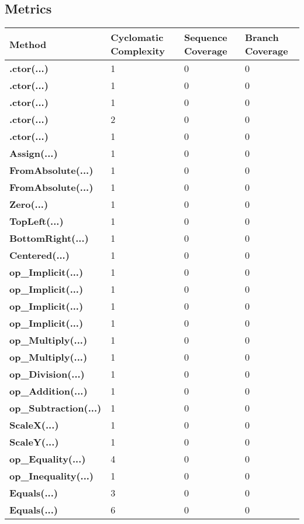 \documentclass[a4paper,10pt]{article}
\begin{document}
\subsection{Metrics}
\begin{longtable}[l]{|l|l|l|l|}
\hline
\textbf{Method} & \textbf{Cyclomatic Complexity} & \textbf{Sequence Coverage} & \textbf{Branch Coverage}\\
\hline
\textbf{.ctor(...)} & 1 & 0 & 0\\
\hline
\textbf{.ctor(...)} & 1 & 0 & 0\\
\hline
\textbf{.ctor(...)} & 1 & 0 & 0\\
\hline
\textbf{.ctor(...)} & 2 & 0 & 0\\
\hline
\textbf{.ctor(...)} & 1 & 0 & 0\\
\hline
\textbf{Assign(...)} & 1 & 0 & 0\\
\hline
\textbf{FromAbsolute(...)} & 1 & 0 & 0\\
\hline
\textbf{FromAbsolute(...)} & 1 & 0 & 0\\
\hline
\textbf{Zero(...)} & 1 & 0 & 0\\
\hline
\textbf{TopLeft(...)} & 1 & 0 & 0\\
\hline
\textbf{BottomRight(...)} & 1 & 0 & 0\\
\hline
\textbf{Centered(...)} & 1 & 0 & 0\\
\hline
\textbf{op\_Implicit(...)} & 1 & 0 & 0\\
\hline
\textbf{op\_Implicit(...)} & 1 & 0 & 0\\
\hline
\textbf{op\_Implicit(...)} & 1 & 0 & 0\\
\hline
\textbf{op\_Implicit(...)} & 1 & 0 & 0\\
\hline
\textbf{op\_Multiply(...)} & 1 & 0 & 0\\
\hline
\textbf{op\_Multiply(...)} & 1 & 0 & 0\\
\hline
\textbf{op\_Division(...)} & 1 & 0 & 0\\
\hline
\textbf{op\_Addition(...)} & 1 & 0 & 0\\
\hline
\textbf{op\_Subtraction(...)} & 1 & 0 & 0\\
\hline
\textbf{ScaleX(...)} & 1 & 0 & 0\\
\hline
\textbf{ScaleY(...)} & 1 & 0 & 0\\
\hline
\textbf{op\_Equality(...)} & 4 & 0 & 0\\
\hline
\textbf{op\_Inequality(...)} & 1 & 0 & 0\\
\hline
\textbf{Equals(...)} & 3 & 0 & 0\\
\hline
\textbf{Equals(...)} & 6 & 0 & 0\\
\hline
\end{longtable}
\end{document}
